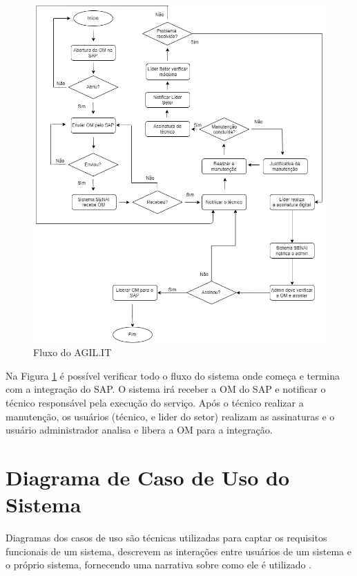 {{		\newpage
		\begin{figure}[htb]
			\caption{\label{flux_sys}Fluxo do AGIL.IT}
			\begin{center}
				\includegraphics[scale=0.55]{./Figuras/fluxo-sistema.png}
			\end{center}
		\end{figure}
		
		Na Figura \ref{flux_sys} é possível verificar todo o fluxo do sistema onde começa e termina com a integração do SAP.
		O sistema irá receber a OM do SAP e notificar o técnico responsável pela execução do serviço. Após o técnico realizar a manutenção, os usuários (técnico, e lider do setor) realizam as assinaturas e o usuário administrador analisa e libera a OM para a integração.
		
		
		\section{Diagrama de Caso de Uso do Sistema }
		
		{Diagramas dos casos de uso são técnicas utilizadas para captar os requisitos funcionais de um sistema, descrevem as interações entre usuários de um sistema e o próprio sistema, fornecendo uma narrativa sobre como ele é utilizado \cite{umlessencial2005}.
			
}}}
